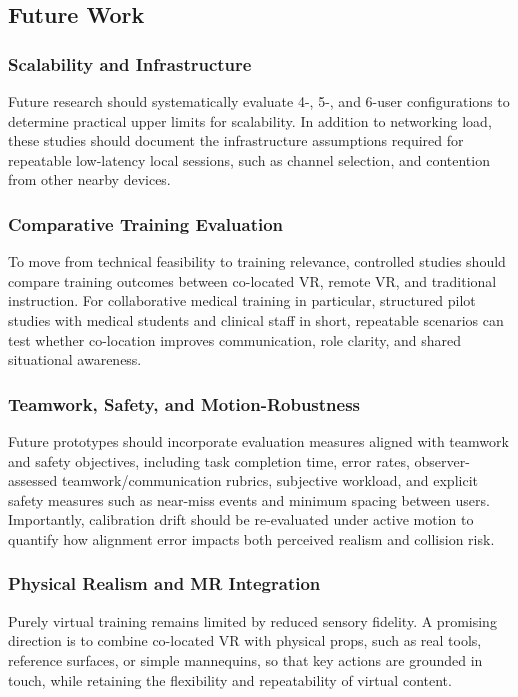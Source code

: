 \subsection{Future Work}

\subsubsection{Scalability and Infrastructure}
Future research should systematically evaluate 4-, 5-, and 6-user configurations to determine practical upper limits for scalability. In addition to networking load, these studies should document the infrastructure assumptions required for repeatable low-latency local sessions, such as channel selection, and contention from other nearby devices.

\subsubsection{Comparative Training Evaluation}
To move from technical feasibility to training relevance, controlled studies should compare training outcomes between co-located VR, remote VR, and traditional instruction. For collaborative medical training in particular, structured pilot studies with medical students and clinical staff in short, repeatable scenarios can test whether co-location improves communication, role clarity, and shared situational awareness.

\subsubsection{Teamwork, Safety, and Motion-Robustness}
Future prototypes should incorporate evaluation measures aligned with teamwork and safety objectives, including task completion time, error rates, observer-assessed teamwork/communication rubrics, subjective workload, and explicit safety measures such as near-miss events and minimum spacing between users. Importantly, calibration drift should be re-evaluated under active motion to quantify how alignment error impacts both perceived realism and collision risk.

\subsubsection{Physical Realism and MR Integration}
Purely virtual training remains limited by reduced sensory fidelity. A promising direction is to combine co-located VR with physical props, such as real tools, reference surfaces, or simple mannequins, so that key actions are grounded in touch, while retaining the flexibility and repeatability of virtual content.

